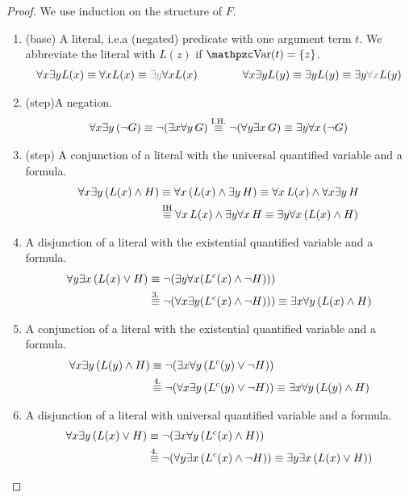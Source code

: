 \begin{proof}We use induction on the structure of $F$.
	\begin{enumerate}
		\item (base) A literal,
		i.e.a (negated) predicate with one argument term $t$.
		We abbreviate the literal with $L(z)$ if $\var(t) = \{ z \}$. 
		\begin{gather*}
			\forall x \exists y L(x)  \equiv \forall x L(x) \equiv {\colG \exists y} \forall x L(x)
			\qquad\qquad
			\forall x \exists y L(y)  \equiv \exists y L(y) \equiv \exists y{\colG \forall x}  L(y)
		\end{gather*}
		\item (step)A negation.
		\begin{gather*}
		\forall x \exists y\, (\lnot G) 
		\equiv \lnot (\exists x \forall y\, G)
		\defEV[I.H.] \lnot (\forall y\exists x \, G) 
		\equiv \exists y \forall x\, (\lnot G)
		\end{gather*}
		\item (step) A conjunction 
		of a literal with the universal quantified variable and a formula.
		\begin{align*}
		\forall x \exists y\,({L(x)\land H}) 
		&\equiv \forall x\,({L(x)} \land \exists y\,{H})
		\equiv \forall x\,L(x)\land \forall x\exists y\,H
		\\&\defEV[IH] \forall x\,{L(x)} \land \exists y\forall x\,{H}
		\equiv\exists y \forall x\,({L(x)\land H})
		\end{align*}
		\item A disjunction of a literal with the existential quantified variable and a formula.
		\begin{align*}
		\forall y \exists x\,({L(x)\lor H}) 
		&\equiv\lnot(\exists y \forall x (L^c(x)\land\lnot H)))\\
		&\defEV[3.]\lnot(\forall x\exists y  (L^c(x)\land\lnot H))) 
		\equiv \exists x\forall y\, (L(x) \land H)
		\end{align*}
		\item A conjunction of a literal with the existential quantified variable and a formula.
		\begin{align*}
		\forall x \exists y\,({L(y)\land H}) 
		&\equiv\lnot(\exists x\forall y \,({L^c(y) \lor \lnot H})) \\
		&\defEV[4.]\lnot(\forall x\exists y \,({L^c(y) \lor \lnot H}) )
		\equiv \exists x\forall y\,(L(y)\land H)
		\end{align*}
		\item A disjunction of a literal with universal quantified variable and a formula.
		\begin{align*}
		\forall x \exists y\,(L(x)\lor H) 
		&\equiv \lnot (\exists x\forall y\,(L^c(x) \land H)) \\
		&\defEV[4.]\lnot (\forall y\exists x\,(L^c(x) \land\lnot H)) 
		\equiv \exists y \exists x\,(L(x)\lor H))\\
		\end{align*}
	\end{enumerate}
\end{proof}


